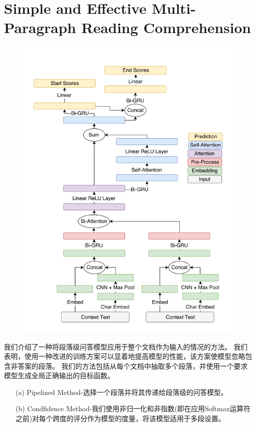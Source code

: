 \documentclass[a4paper,UTF8]{article}
\numberwithin{equation}{section}
\begin{document}
\section{Simple and Effective Multi-Paragraph Reading Comprehension}
\begin{figure}[H]
	\centering
	\includegraphics[width=\textwidth]{8-1.png}
\end{figure}
我们介绍了一种将段落级问答模型应用于整个文档作为输入的情况的方法。
我们表明，使用一种改进的训练方案可以显着地提高模型的性能，该方案使模型忽略包含非答案的段落。
我们的方法包括从每个文档中抽取多个段落，并使用一个要求模型生成全局正确输出的目标函数。
\begin{enumerate}
	\item[(a)] Pipelined Method-选择一个段落并将其传递给段落级的问答模型。
	\item[(b)] Condfidence Method-我们使用非归一化和非指数(即在应用Softmax运算符之前)对每个跨度的评分作为模型的度量，将该模型适用于多段设置。 
\end{enumerate}
\newpage
\end{document}
